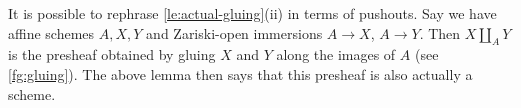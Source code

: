 
        It is possible to rephrase \cref{le:actual-gluing}(ii) in terms of pushouts.
        Say we have affine schemes $A,X,Y$ and Zariski-open immersions $A\to X$, $A\to Y$.
        Then $X\coprod_A Y$ is the presheaf obtained by gluing $X$ and $Y$ along the images of $A$ (see \cref{fg:gluing}).
        The above lemma then says that this presheaf is also actually a scheme.



